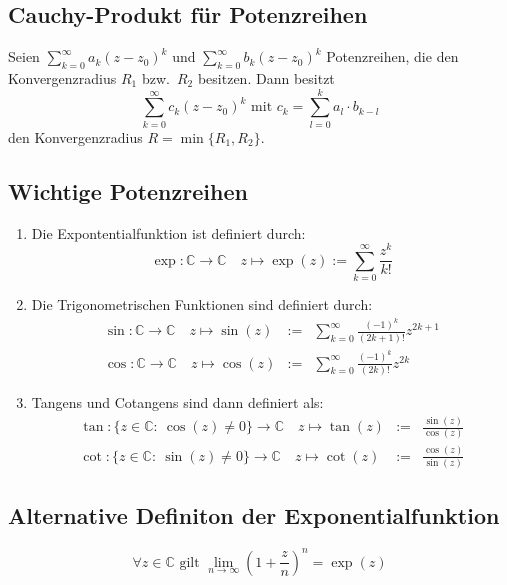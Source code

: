 \documentclass[10pt]{article}
\newcommand{\C}{\mathbb{C}}
\begin{document}
    \subsection{Cauchy-Produkt für Potenzreihen}
    Seien $\sum_{k=0}^\infty a_k {(z-z_0)}^k$ und
    $\sum_{k=0}^\infty b_k {(z-z_0)}^k$ Potenzreihen, die den Konvergenzradius
    $R_1$ bzw.\ $R_2$ besitzen. Dann besitzt
    \begin{equation*}
            \sum_{k=0}^\infty c_k {(z-z_0)}^k \text{ mit }
            c_k = \sum_{l=0}^k a_l \cdot b_{k-l}
    \end{equation*}
    den Konvergenzradius $R = \min \{R_1, R_2\}$.

    \subsection{Wichtige Potenzreihen}
    \begin{enumerate}[label= (\alph*)]
        \item Die Expontentialfunktion ist definiert durch:
            \begin{equation*}
                \exp: \C \rightarrow \C\quad z \mapsto \exp(z) :=
                \sum_{k=0}^\infty \frac{z^k}{k!}
            \end{equation*}
        \item Die Trigonometrischen Funktionen sind definiert durch:
            \begin{eqnarray*}
                \sin: \C \rightarrow \C\quad z \mapsto \sin(z) &:=&
                \sum_{k=0}^\infty \frac{{(-1)}^k}{(2k+1)!}z^{2k+1}\\
                \cos: \C \rightarrow \C\quad z \mapsto \cos(z) &:=&
                \sum_{k=0}^\infty \frac{{(-1)}^k}{(2k)!}z^{2k}
            \end{eqnarray*}
        \item Tangens und Cotangens sind dann definiert als:
            \begin{eqnarray*}
                \tan: \{z \in \C:\ \cos(z) \neq 0 \} \rightarrow \C\quad
                z \mapsto \tan(z)&:=&\frac{\sin(z)}{\cos(z)}\\
                \cot: \{z \in \C:\ \sin(z) \neq 0 \} \rightarrow \C\quad
                z \mapsto \cot(z)&:=&\frac{\cos(z)}{\sin(z)}
            \end{eqnarray*}
    \end{enumerate}

    \subsection{Alternative Definiton der Exponentialfunktion}
    \begin{equation*}
        \forall z \in \C \text{ gilt }
        \lim_{n \rightarrow \infty} {\left(1 + \frac{z}{n}\right)}^n = \exp{(z)}
    \end{equation*}
\end{document}
